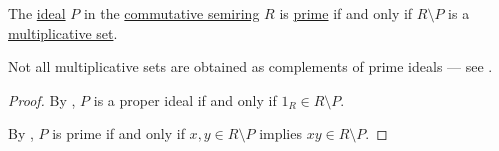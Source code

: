 \begin{proposition}\label{thm:complement_of_prime_ideal}
  The \hyperref[def:semiring_ideal]{ideal} \( P \) in the \hyperref[def:semiring/commutative]{commutative semiring} \( R \) is \hyperref[def:semiring_ideal/prime]{prime} if and only if \( R \setminus P \) is a \hyperref[def:multiplicative_set_in_semiring]{multiplicative set}.

  Not all multiplicative sets are obtained as complements of prime ideals --- see .
\end{proposition}
\begin{proof}
  By , \( P \) is a proper ideal if and only if \( 1_R \in R \setminus P \).

  By , \( P \) is prime if and only if \( x, y \in R \setminus P \) implies \( xy \in R \setminus P \).
\end{proof}

